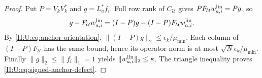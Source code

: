 \begin{proof}
Put $P=V_kV_k^*$ and $g=L_a^*f_i$. Full row rank of
$C_{\mathcal U}$ gives $PF_{\mathcal U}w_{a,i}^{\rm lin}=Pg$, so
\[
 g-F_{\mathcal U}w_{a,i}^{\rm lin}
 =(I-P)g-(I-P)F_{\mathcal U}w_{a,i}^{\rm lin}.
\]
By \eqref{II:U:eq:anchor-orientation}, $\|(I-P)g\|_2\le
\epsilon_k/\mu_{\min}$. Each column of $(I-P)F_{\mathcal U}$
has the same bound, hence its operator norm is at most
$\sqrt N\epsilon_k/\mu_{\min}$.
Finally $\|g\|_2\le\|f_i\|_1=1$ yields
$\|w_{a,i}^{\rm lin}\|_2\le\kappa$. The triangle inequality proves
\eqref{II:U:eq:signed-anchor-defect}.
\end{proof}
